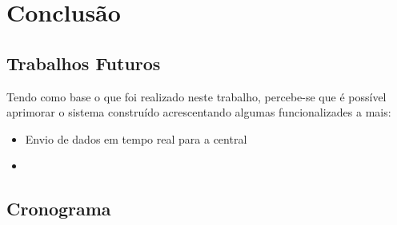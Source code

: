 \chapter{Conclusão}

\section{Trabalhos Futuros}
Tendo como base o que foi realizado neste trabalho, percebe-se que é possível aprimorar o sistema construído acrescentando algumas funcionalizades a mais:
\begin{itemize}
    \item Envio de dados em tempo real para a central
    \item 
\end{itemize}

\section{Cronograma}
